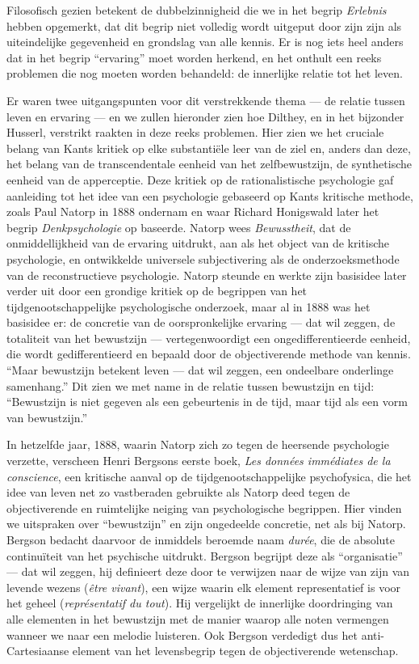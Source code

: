 Filosofisch gezien betekent de dubbelzinnigheid die we in het begrip \textit{Erlebnis} hebben opgemerkt, dat dit begrip niet volledig wordt uitgeput door zijn zijn als uiteindelijke gegevenheid en grondslag van alle kennis. Er is nog iets heel anders dat in het begrip ``ervaring'' moet worden herkend, en het onthult een reeks problemen die nog moeten worden behandeld: de innerlijke relatie tot het leven.

Er waren twee uitgangspunten voor dit verstrekkende thema — de relatie tussen leven en ervaring — en we zullen hieronder zien hoe Dilthey, en in het bijzonder Husserl, verstrikt raakten in deze reeks problemen. Hier zien we het cruciale belang van Kants kritiek op elke substantiële leer van de ziel en, anders dan deze, het belang van de transcendentale eenheid van het zelfbewustzijn, de synthetische eenheid van de apperceptie. Deze kritiek op de rationalistische psychologie gaf aanleiding tot het idee van een psychologie gebaseerd op Kants kritische methode, zoals Paul Natorp in 1888 ondernam en waar Richard Honigswald later het begrip \textit{Denkpsychologie} op baseerde. Natorp wees \textit{Bewusstheit}, dat de onmiddellijkheid van de ervaring uitdrukt, aan als het object van de kritische psychologie, en ontwikkelde universele subjectivering als de onderzoeksmethode van de reconstructieve psychologie. Natorp steunde en werkte zijn basisidee later verder uit door een grondige kritiek op de begrippen van het tijdgenootschappelijke psychologische onderzoek, maar al in 1888 was het basisidee er: de concretie van de oorspronkelijke ervaring — dat wil zeggen, de totaliteit van het bewustzijn — vertegenwoordigt een ongedifferentieerde eenheid, die wordt gedifferentieerd en bepaald door de objectiverende methode van kennis. ``Maar bewustzijn betekent leven — dat wil zeggen, een ondeelbare onderlinge samenhang.'' Dit zien we met name in de relatie tussen bewustzijn en tijd: ``Bewustzijn is niet gegeven als een gebeurtenis in de tijd, maar tijd als een vorm van bewustzijn.''

In hetzelfde jaar, 1888, waarin Natorp zich zo tegen de heersende psychologie verzette, verscheen Henri Bergsons eerste boek, \textit{Les données immédiates de la conscience}, een kritische aanval op de tijdgenootschappelijke psychofysica, die het idee van leven net zo vastberaden gebruikte als Natorp deed tegen de objectiverende en ruimtelijke neiging van psychologische begrippen. Hier vinden we uitspraken over ``bewustzijn'' en zijn ongedeelde concretie, net als bij Natorp. Bergson bedacht daarvoor de inmiddels beroemde naam \textit{durée}, die de absolute continuïteit van het psychische uitdrukt. Bergson begrijpt deze als ``organisatie'' — dat wil zeggen, hij definieert deze door te verwijzen naar de wijze van zijn van levende wezens (\textit{être vivant}), een wijze waarin elk element representatief is voor het geheel (\textit{représentatif du tout}). Hij vergelijkt de innerlijke doordringing van alle elementen in het bewustzijn met de manier waarop alle noten vermengen wanneer we naar een melodie luisteren. Ook Bergson verdedigt dus het anti-Cartesiaanse element van het levensbegrip tegen de objectiverende wetenschap.

